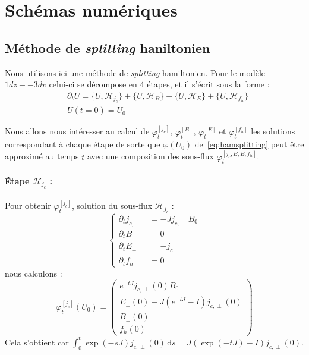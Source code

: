 
\section{Schémas numériques}

\subsection{Méthode de \emph{splitting} haniltonien}

Nous utilisons ici une méthode de \emph{splitting} hamiltonien. Pour le modèle $1dz -- 3dv$ celui-ci se décompose en 4 étapes, et il s'écrit sous la forme :
\begin{equation}
  \begin{aligned}
    & \partial_t U = \{ U,\mathcal{H}_{j_c}\} + \{ U,\mathcal{H}_B\} + \{ U,\mathcal{H}_E\} + \{ U,\mathcal{H}_{f_h}\} \\
    & U(t=0) = U_0
  \end{aligned}
  \label{eq:hamsplitting}
\end{equation}

Nous allons nous intéresser au calcul de $\varphi_t^{[j_c]}$, $\varphi_t^{[B]}$, $\varphi_t^{[E]}$ et $\varphi_t^{[f_h]}$ les solutions correspondant à chaque étape de sorte que $\varphi(U_0)$ de~\eqref{eq:hamsplitting} peut être approximé au temps $t$ avec une composition des sous-flux $\varphi_t^{[j_c,B,E,f_h]}$.

\paragraph{Étape $\mathcal{H}_{j_c}$ :\\}

Pour obtenir $\varphi_t^{[j_c]}$, solution du sous-flux $\mathcal{H}_{j_c}$ :
$$
  \begin{cases}
    \partial_t j_{c,\perp} &= -Jj_{c,\perp}B_0 \\
    \partial_t B_\perp     &= 0 \\
    \partial_t E_\perp     &= -j_{c,\perp} \\
    \partial_t f_h         &= 0
  \end{cases}
$$
nous calculons :
$$
  \varphi_t^{[j_c]}(U_0) = \begin{pmatrix}
    e^{-tJ}j_{c,\perp}(0)B_0 \\
    E_\perp(0) - J\left(e^{-tJ}-I\right)j_{c,\perp}(0) \\
    B_\perp(0) \\
    f_h(0)
  \end{pmatrix}
$$
Cela s'obtient car $\int_0^t \exp(-sJ)j_{c,\perp}(0)\,\mathrm{d}s = J\left(\exp(-tJ)-I\right)j_{c,\perp}(0)$.


